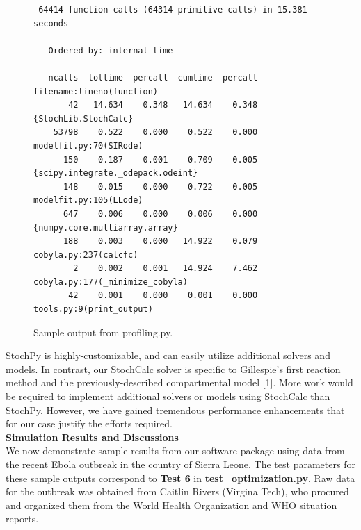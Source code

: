 \documentclass[11pt,letter]{article}
\begin{document}
\begin{figure}
\begin{lstlisting}
 64414 function calls (64314 primitive calls) in 15.381 seconds

   Ordered by: internal time

   ncalls  tottime  percall  cumtime  percall filename:lineno(function)
       42   14.634    0.348   14.634    0.348 {StochLib.StochCalc}
    53798    0.522    0.000    0.522    0.000 modelfit.py:70(SIRode)
      150    0.187    0.001    0.709    0.005 {scipy.integrate._odepack.odeint}
      148    0.015    0.000    0.722    0.005 modelfit.py:105(LLode)
      647    0.006    0.000    0.006    0.000 {numpy.core.multiarray.array}
      188    0.003    0.000   14.922    0.079 cobyla.py:237(calcfc)
        2    0.002    0.001   14.924    7.462 cobyla.py:177(_minimize_cobyla)
       42    0.001    0.000    0.001    0.000 tools.py:9(print_output)
\end{lstlisting}
\caption{Sample output from profiling.py.}
\label{fig:profiling_results}
\end{figure}

StochPy is highly-customizable, and can easily utilize additional solvers and models. In contrast, our StochCalc solver is specific to Gillespie's first reaction method and the previously-described compartmental model [1]. More work would be required to implement additional solvers or models using StochCalc than StochPy. However, we have gained tremendous performance enhancements that for our case justify the efforts required.\\

\underline{\textbf{Simulation Results and Discussions}}\vspace{0.5mm}\\
We now demonstrate sample results from our software package using data from the recent Ebola outbreak in the country of Sierra Leone. The test parameters for these sample outputs correspond to \textbf{Test 6} in \textbf{test\_optimi\-za\-tion.py}. Raw data for the outbreak was obtained from Caitlin Rivers (Virgina Tech), who procured and organized them from the World Health Organization and WHO situation reports. \\
\end{document}
